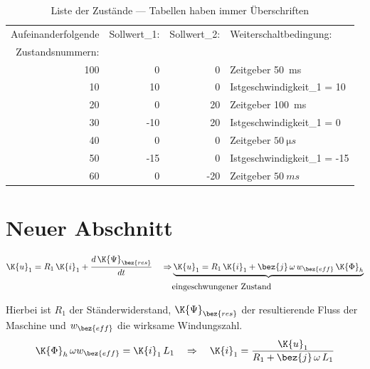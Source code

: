 \begin{table}[ht!]
 \centering
 \caption{Liste der Zustände --- Tabellen haben immer Überschriften}
 \label{tab:Zustaende}
 \begin{tabular}{|r|r|r|l|}
   \hline
   Aufeinanderfolgende & Sollwert\_1: & Sollwert\_2: & Weiterschaltbedingung: \\
   Zustandsnummern: & & & \\
   \hline
   100 & 0 & 0 & Zeitgeber \SI{50}{ms} \\
   10 & 10 & 0 & Istgeschwindigkeit\_1 = 10\\
   20 & 0 & 20 & Zeitgeber \SI{100}{ms} \\
   30 & -10 & 20 & Istgeschwindigkeit\_1 = 0 \\
   40 & 0 & 0 & Zeitgeber $\SI{50}{\micro s}$ \\
   50 & -15 & 0 & Istgeschwindigkeit\_1 = -15 \\
   60 & 0 & -20 & Zeitgeber $\SI{50}{ms}$ \\
   \hline
  \end{tabular}
\end{table}

\pagebreak	%

\section{Neuer Abschnitt}

\begin{eqnarray}
\K{u}_1 = R_1 \, \K{i}_1 + \frac{d \, \K{\Psi}_\bez{res}}{dt} \quad \Rightarrow&
\underbrace{\K{u}_1 = R_1 \, \K{i}_1 + \bez{j} \, \omega \, w_\bez{eff} \, \K{\Phi}_h}  \\
 & \text{eingeschwungener Zustand} \nonumber
\end{eqnarray}

Hierbei ist $R_1$ der Ständerwiderstand, $\K{\Psi}_\bez{res}$ der
resultierende Fluss der Maschine und $w_\bez{eff}$ die wirksame
Windungszahl.
\begin{equation}
 \K{\Phi}_h \, \omega w_\bez{eff} = \K{i}_1 \, L_1 \quad \Rightarrow  \quad
 \K{i}_1 = \frac{\K{u}_1}{R_1 + \bez{j} \, \omega \, L_1}
\label{eqn:is}
\end{equation}

